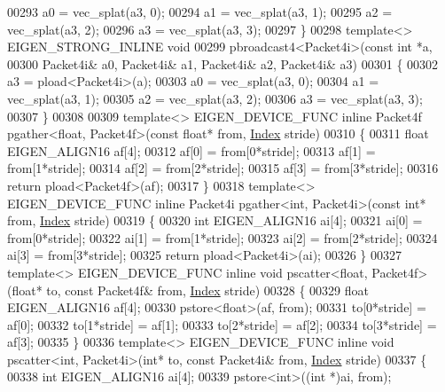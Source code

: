 \begin{DoxyCode}
{00293   a0 = vec\_splat(a3, 0);
00294   a1 = vec\_splat(a3, 1);
00295   a2 = vec\_splat(a3, 2);
00296   a3 = vec\_splat(a3, 3);
00297 \}
00298 \textcolor{keyword}{template}<> EIGEN\_STRONG\_INLINE \textcolor{keywordtype}{void}
00299 pbroadcast4<Packet4i>(\textcolor{keyword}{const} \textcolor{keywordtype}{int} *a,
00300                       Packet4i& a0, Packet4i& a1, Packet4i& a2, Packet4i& a3)
00301 \{
00302   a3 = pload<Packet4i>(a);
00303   a0 = vec\_splat(a3, 0);
00304   a1 = vec\_splat(a3, 1);
00305   a2 = vec\_splat(a3, 2);
00306   a3 = vec\_splat(a3, 3);
00307 \}
00308 
00309 \textcolor{keyword}{template}<> EIGEN\_DEVICE\_FUNC \textcolor{keyword}{inline} Packet4f pgather<float, Packet4f>(\textcolor{keyword}{const} \textcolor{keywordtype}{float}* from, 
      \hyperlink{namespace_eigen_a62e77e0933482dafde8fe197d9a2cfde}{Index} stride)
00310 \{
00311   \textcolor{keywordtype}{float} EIGEN\_ALIGN16 af[4];
00312   af[0] = from[0*stride];
00313   af[1] = from[1*stride];
00314   af[2] = from[2*stride];
00315   af[3] = from[3*stride];
00316  \textcolor{keywordflow}{return} pload<Packet4f>(af);
00317 \}
00318 \textcolor{keyword}{template}<> EIGEN\_DEVICE\_FUNC \textcolor{keyword}{inline} Packet4i pgather<int, Packet4i>(\textcolor{keyword}{const} \textcolor{keywordtype}{int}* from, 
      \hyperlink{namespace_eigen_a62e77e0933482dafde8fe197d9a2cfde}{Index} stride)
00319 \{
00320   \textcolor{keywordtype}{int} EIGEN\_ALIGN16 ai[4];
00321   ai[0] = from[0*stride];
00322   ai[1] = from[1*stride];
00323   ai[2] = from[2*stride];
00324   ai[3] = from[3*stride];
00325  \textcolor{keywordflow}{return} pload<Packet4i>(ai);
00326 \}
00327 \textcolor{keyword}{template}<> EIGEN\_DEVICE\_FUNC \textcolor{keyword}{inline} \textcolor{keywordtype}{void} pscatter<float, Packet4f>(\textcolor{keywordtype}{float}* to, \textcolor{keyword}{const} Packet4f& from, 
      \hyperlink{namespace_eigen_a62e77e0933482dafde8fe197d9a2cfde}{Index} stride)
00328 \{
00329   \textcolor{keywordtype}{float} EIGEN\_ALIGN16 af[4];
00330   pstore<float>(af, from);
00331   to[0*stride] = af[0];
00332   to[1*stride] = af[1];
00333   to[2*stride] = af[2];
00334   to[3*stride] = af[3];
00335 \}
00336 \textcolor{keyword}{template}<> EIGEN\_DEVICE\_FUNC \textcolor{keyword}{inline} \textcolor{keywordtype}{void} pscatter<int, Packet4i>(\textcolor{keywordtype}{int}* to, \textcolor{keyword}{const} Packet4i& from, 
      \hyperlink{namespace_eigen_a62e77e0933482dafde8fe197d9a2cfde}{Index} stride)
00337 \{
00338   \textcolor{keywordtype}{int} EIGEN\_ALIGN16 ai[4];
00339   pstore<int>((\textcolor{keywordtype}{int} *)ai, from);
}
\end{DoxyCode}
